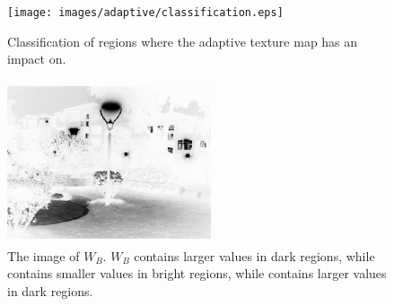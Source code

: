 \begin{figure}[tb]
	\centering
	\texttt{[image: images/adaptive/classification.eps]}
	\caption{Classification of regions where the adaptive texture map has an impact on.} \label{fig:adaptive/classification}
\end{figure}
\begin{figure}[htbp]
	\centering
	\includegraphics[width=60mm, height=48mm]{images/adaptive/wb.eps}
	\caption{The image of $W_{B}$. $W_{B}$ contains larger values in dark regions, while contains smaller values in bright regions, while contains larger values in dark regions.} \label{fig:adaptive/wb}
\end{figure}
